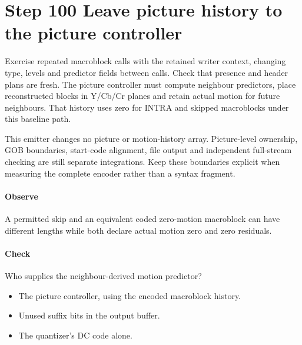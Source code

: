 \section{Step 100 Leave picture history to the picture controller}\label{h263-syntax-s10}
Exercise repeated macroblock calls with the retained writer context, changing
type, levels and predictor fields between calls. Check that presence and header
plans are fresh. The picture controller must compute neighbour predictors, place
reconstructed blocks in Y/Cb/Cr planes and retain actual motion for future neighbours.
That history uses zero for INTRA and skipped macroblocks under this baseline path.

This emitter changes no picture or motion-history array. Picture-level ownership,
GOB boundaries, start-code alignment, file output and independent full-stream
checking are still separate integrations. Keep these boundaries explicit when
measuring the complete encoder rather than a syntax fragment.

\paragraph{Observe} A permitted skip and an equivalent coded zero-motion macroblock
can have different lengths while both declare actual motion zero and zero residuals.
\paragraph{Check} Who supplies the neighbour-derived motion predictor?
\begin{itemize}
  \item[A.] The picture controller, using the encoded macroblock history.
  \item[B.] Unused suffix bits in the output buffer.
  \item[C.] The quantizer's DC code alone.
\end{itemize}
